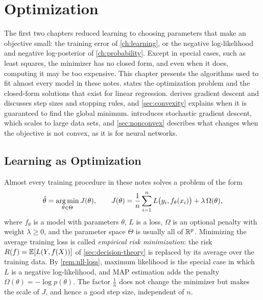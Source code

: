 \chapter{Optimization}\label{ch:optimization}

The first two chapters reduced learning to choosing parameters that make an objective small: the training error of \cref{ch:learning}, or the negative log-likelihood and negative log-posterior of \cref{ch:probability}. Except in special cases, such as least squares, the minimizer has no closed form, and even when it does, computing it may be too expensive. This chapter presents the algorithms used to fit almost every model in these notes.  states the optimization problem and the closed-form solutions that exist for linear regression.  derives gradient descent and discusses step sizes and stopping rules, and \cref{sec:convexity} explains when it is guaranteed to find the global minimum.  introduces stochastic gradient descent, which scales to large data sets, and \cref{sec:nonconvex} describes what changes when the objective is not convex, as it is for neural networks.

\section{Learning as Optimization}\label{sec:erm}

Almost every training procedure in these notes solves a problem of the form
\begin{equation}\label{eq:erm}
\hat\theta=\operatorname*{arg\,min}_{\theta\in\Theta}J(\theta),\qquad J(\theta)=\frac1n\sum_{i=1}^nL\big(y_i,f_\theta(x_i)\big)+\lambda\,\Omega(\theta),
\end{equation}
where $f_\theta$ is a model with parameters $\theta$, $L$ is a loss, $\Omega$ is an optional penalty with weight $\lambda\ge0$, and the parameter space $\Theta$ is usually all of $\mathbb{R}^p$. Minimizing the average training loss is called \emph{empirical risk minimization}: the risk $R(f)=\mathbb{E}[L(Y,f(X))]$ of \cref{sec:decision-theory} is replaced by its average over the training data. By \cref{rem:nll-loss}, maximum likelihood is the special case in which $L$ is a negative log-likelihood, and MAP estimation adds the penalty $\Omega(\theta)=-\log p(\theta)$. The factor $\frac1n$ does not change the minimizer but makes the scale of $J$, and hence a good step size, independent of $n$.


